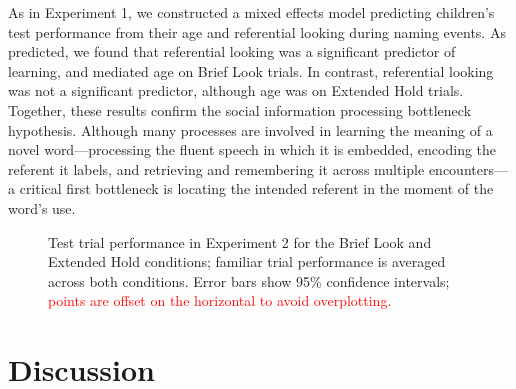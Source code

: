 \documentclass{pnastwo}
\newcommand{\red}[1]{\textcolor{red}{#1}}
\begin{document}
\begin{article}
As in Experiment 1, we constructed a mixed effects model predicting children's test performance from their age and referential looking during naming events. As predicted, we found that referential looking was a significant predictor of learning, and mediated age on Brief Look trials. In contrast, referential looking was not a significant predictor, although age was on Extended Hold trials. Together, these results confirm the social information processing bottleneck hypothesis. Although many processes are involved in learning the meaning of a novel word---processing the fluent speech in which it is embedded, encoding the referent it labels, and retrieving and remembering it across multiple encounters---a critical first bottleneck is locating the intended referent in the moment of the word's use. 

\begin{figure}[h]
	\caption{\label{fig:reflook_test} Test trial performance in Experiment 2 for the Brief Look and Extended Hold conditions; familiar trial performance is averaged across both conditions. Error bars show 95\% confidence intervals; \red{points are offset on the horizontal to avoid overplotting.}}
\end{figure}

\section{Discussion}

\begin{materials}


\end{materials}
\end{article}
\end{document}
